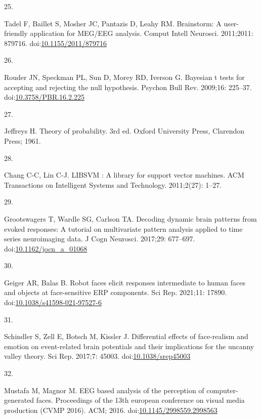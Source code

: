 \documentclass[
]{article}
\newlength{\cslhangindent}
\newlength{\csllabelwidth}
\newenvironment{CSLReferences}[2] %
 {\begin{list}{}{%
  \setlength{\itemindent}{0pt}
  \setlength{\leftmargin}{0pt}
  \setlength{\parsep}{0pt}
  \ifodd #1
   \setlength{\leftmargin}{\cslhangindent}
   \setlength{\itemindent}{-1\cslhangindent}
  \fi
  \setlength{\itemsep}{#2\baselineskip}}}
 {\end{list}}
\newcommand{\CSLLeftMargin}[1]{\parbox[t]{\csllabelwidth}{\strut#1\strut}}
\newcommand{\CSLRightInline}[1]{\parbox[t]{\linewidth - \csllabelwidth}{\strut#1\strut}}
\begin{document}
\begin{CSLReferences}{0}{1}
\CSLLeftMargin{25. }%
\CSLRightInline{Tadel F, Baillet S, Mosher JC, Pantazis D, Leahy RM. Brainstorm: A user-friendly application for MEG/EEG analysis. Comput Intell Neurosci. 2011;2011: 879716. doi:\href{https://doi.org/10.1155/2011/879716}{10.1155/2011/879716}}

\CSLLeftMargin{26. }%
\CSLRightInline{Rouder JN, Speckman PL, Sun D, Morey RD, Iverson G. Bayesian t tests for accepting and rejecting the null hypothesis. Psychon Bull Rev. 2009;16: 225--37. doi:\href{https://doi.org/10.3758/PBR.16.2.225}{10.3758/PBR.16.2.225}}

\CSLLeftMargin{27. }%
\CSLRightInline{Jeffreys H. Theory of probability. 3rd ed. Oxford University Press, Clarendon Press; 1961. }

\CSLLeftMargin{28. }%
\CSLRightInline{Chang C-C, Lin C-J. {LIBSVM} : A library for support vector machines. ACM Transactions on Intelligent Systems and Technology. 2011;2(27): 1--27. }

\CSLLeftMargin{29. }%
\CSLRightInline{Grootswagers T, Wardle SG, Carlson TA. Decoding dynamic brain patterns from evoked responses: A tutorial on multivariate pattern analysis applied to time series neuroimaging data. J Cogn Neurosci. 2017;29: 677--697. doi:\href{https://doi.org/10.1162/jocn_a_01068}{10.1162/jocn\_a\_01068}}

\CSLLeftMargin{30. }%
\CSLRightInline{Geiger AR, Balas B. Robot faces elicit responses intermediate to human faces and objects at face-sensitive ERP components. Sci Rep. 2021;11: 17890. doi:\href{https://doi.org/10.1038/s41598-021-97527-6}{10.1038/s41598-021-97527-6}}

\CSLLeftMargin{31. }%
\CSLRightInline{Schindler S, Zell E, Botsch M, Kissler J. Differential effects of face-realism and emotion on event-related brain potentials and their implications for the uncanny valley theory. Sci Rep. 2017;7: 45003. doi:\href{https://doi.org/10.1038/srep45003}{10.1038/srep45003}}

\CSLLeftMargin{32. }%
\CSLRightInline{Mustafa M, Magnor M. EEG based analysis of the perception of computer-generated faces. Proceedings of the 13th european conference on visual media production (CVMP 2016). ACM; 2016. doi:\href{https://doi.org/10.1145/2998559.2998563}{10.1145/2998559.2998563}}


\end{CSLReferences}
\end{document}
